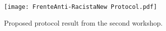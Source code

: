 
%

\begin{figure}
    \centering
    \texttt{[image: FrenteAnti-RacistaNew Protocol.pdf]}
    \caption{Proposed protocol result from the second workshop.}
    \label{fig:PROPOSED_workshop2}
\end{figure}